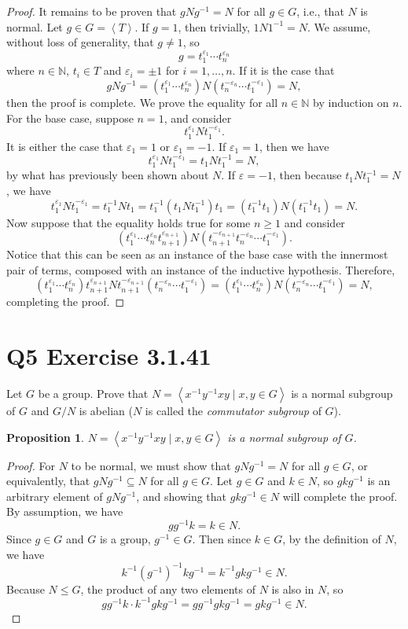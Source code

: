 \documentclass[12pt]{article}
\newtheorem{proposition}{Proposition}
\newenvironment{problem}
    {\begin{lrbox}{\mybox}\begin{minipage}{\textwidth-10pt}}
    {\end{minipage}\end{lrbox}\framebox[6.5in]{\usebox{\mybox}}}
\newcommand{\<}{\left\langle}
\renewcommand{\>}{\right\rangle}
\newcommand{\N}{\mathbb{N}}
\let\eps\varepsilon
\begin{document}
\begin{proof}
    It remains to be proven that $gNg^{-1} = N$ for all $g\in G$, i.e., that $N$ is normal. Let $g\in G = \<T\>$. If $g=1$, then trivially, $1N1^{-1} = N$. We assume, without loss of generality, that $g\ne1$, so
    \[g = t_1^{\eps_1}\cdots t_n^{\eps_n}\]
    where $n\in\N$, $t_i\in T$ and $\eps_i=\pm1$ for $i=1,\dots,n$. If it is the case that
    \[gNg^{-1} = (t_1^{\eps_1}\cdots t_n^{\eps_n}) N (t_n^{-\eps_n}\cdots t_1^{-\eps_1}) = N,\]
    then the proof is complete. We prove the equality for all $n\in\N$ by induction on $n$. For the base case, suppose $n=1$, and consider
    \[t_1^{\eps_1}Nt_1^{-\eps_1}.\]
    It is either the case that $\eps_1 = 1$ or $\eps_1 = -1$. If $\eps_1 = 1$, then we have
    \[t_1^{\eps_1}Nt_1^{-\eps_1} = t_1Nt_1^{-1} = N,\]
    by what has previously been shown about $N$. If $\eps = -1$, then because $t_1Nt_1^{-1} = N$, we have
    \[t_1^{\eps_1}Nt_1^{-\eps_1} = t_1^{-1}Nt_1 = t_1^{-1}(t_1Nt_1^{-1})t_1 = (t_1^{-1}t_1)N(t_1^{-1}t_1) = N.\]
    Now suppose that the equality holds true for some $n\geq1$ and consider 
    \[(t_1^{\eps_1}\cdots t_n^{\eps_n}t_{n+1}^{\eps_{n+1}}) N (t_{n+1}^{-\eps_{n+1}}t_n^{-\eps_n}\cdots t_1^{-\eps_1}).\]
    Notice that this can be seen as an instance of the base case with the innermost pair of terms, composed with an instance of the inductive hypothesis. Therefore,
    \[(t_1^{\eps_1}\cdots t_n^{\eps_n})t_{n+1}^{\eps_{n+1}} N t_{n+1}^{-\eps_{n+1}}(t_n^{-\eps_n}\cdots t_1^{-\eps_1}) = (t_1^{\eps_1}\cdots t_n^{\eps_n})N(t_n^{-\eps_n}\cdots t_1^{-\eps_1}) = N,\]
    completing the proof.
     
    
\end{proof}

\newpage
\section*{Q5 Exercise 3.1.41}
\begin{problem}
    Let $G$ be a group. Prove that $N=\<x^{-1}y^{-1}xy \mid x,y\in G\>$ is a normal subgroup of $G$ and $G/N$ is abelian ($N$ is called the \emph{commutator subgroup} of $G$).
\end{problem}

\begin{proposition}
    $N=\<x^{-1}y^{-1}xy \mid x,y\in G\>$ is a normal subgroup of $G$.
\end{proposition}

\begin{proof}
    For $N$ to be normal, we must show that $gNg^{-1} = N$ for all $g\in G$, or equivalently, that $gNg^{-1} \subseteq N$ for all $g\in G$. Let $g\in G$ and $k\in N$, so $gkg^{-1}$ is an arbitrary element of $gNg^{-1}$, and showing that $gkg^{-1} \in N$ will complete the proof. By assumption, we have
    \[gg^{-1}k = k \in N.\]
    Since $g\in G$ and $G$ is a group, $g^{-1}\in G$. Then since $k\in G$, by the definition of $N$, we have
    \[k^{-1}(g^{-1})^{-1}kg^{-1} = k^{-1}gkg^{-1} \in N.\]
    Because $N\leq G$, the product of any two elements of $N$ is also in $N$, so
    \[gg^{-1}k \cdot k^{-1}gkg^{-1} = gg^{-1}gkg^{-1} = gkg^{-1} \in N.\]

\end{proof}
\end{document}
